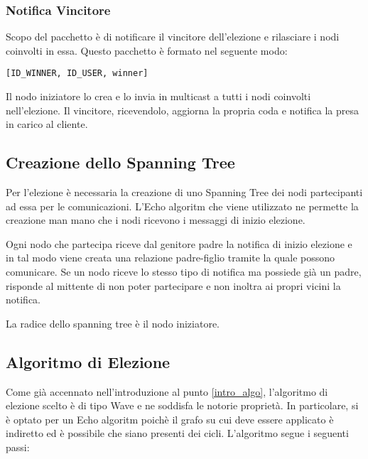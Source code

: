 \subsubsection{Notifica Vincitore}\label{pacchetto_vincitore}
Scopo del pacchetto è di notificare il vincitore dell'elezione e rilasciare i nodi coinvolti in essa. Questo pacchetto è formato nel seguente modo:

\begin{lstlisting}
[ID_WINNER, ID_USER, winner]
\end{lstlisting}

Il nodo iniziatore lo crea e lo invia in multicast a tutti i nodi coinvolti nell'elezione. Il vincitore, ricevendolo, aggiorna la propria coda e notifica la presa in carico al cliente.

\subsection{Creazione dello Spanning Tree}

Per l'elezione è necessaria la creazione di uno Spanning Tree dei nodi partecipanti ad essa per le comunicazioni. L'Echo algoritm che viene utilizzato ne permette la creazione man mano che i nodi ricevono i messaggi di inizio elezione.

Ogni nodo che partecipa riceve dal genitore padre la notifica di inizio elezione e in tal modo viene creata una relazione padre-figlio tramite la quale possono comunicare. Se un nodo riceve lo stesso tipo di notifica ma possiede già un padre, risponde al mittente di non poter partecipare e non inoltra ai propri vicini la notifica.

La radice dello spanning tree è il nodo iniziatore.

\subsection{Algoritmo di Elezione}\label{algoritmo_elezione}

Come già accennato nell'introduzione al punto \ref{intro_algo}, l'algoritmo di elezione scelto è di tipo Wave e ne soddisfa le notorie proprietà. In particolare, si è optato per un Echo algoritm poichè il grafo su cui deve essere applicato è indiretto ed è possibile che siano presenti dei cicli.
L'algoritmo segue i seguenti passi:

